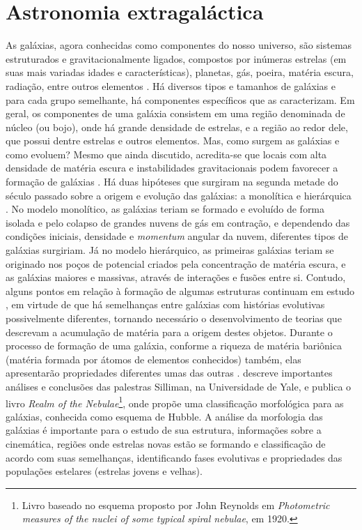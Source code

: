\section{Astronomia extragaláctica}

As galáxias, agora conhecidas como componentes do nosso universo, são sistemas estruturados e gravitacionalmente ligados, compostos por inúmeras estrelas (em suas mais variadas idades e características), planetas, gás, poeira, matéria escura, radiação, entre outros elementos \cite{2018inpe}. Há diversos tipos e tamanhos de galáxias e para cada grupo semelhante, há componentes específicos que as caracterizam. Em geral, os componentes de uma galáxia consistem em uma região denominada de núcleo (ou bojo), onde há grande densidade de estrelas, e a região ao redor dele, que possui dentre estrelas e outros elementos. Mas, como surgem as galáxias e como evoluem? Mesmo que ainda discutido, acredita-se que locais com alta densidade de matéria escura e instabilidades gravitacionais podem favorecer a formação de galáxias \cite{2018sm}. Há duas hipóteses que surgiram na segunda metade do século passado sobre a origem e evolução das galáxias: a monolítica e hierárquica \cite{2022gastao}. No modelo monolítico, as galáxias teriam se formado e evoluído de forma isolada e pelo colapso de grandes nuvens de gás em contração, e dependendo das condições iniciais, densidade e \emph{momentum} angular da nuvem, diferentes tipos de galáxias surgiriam. Já no modelo hierárquico, as primeiras galáxias teriam se originado nos poços de potencial criados pela concentração de matéria escura, e as galáxias maiores e massivas, através de interações e fusões entre si. Contudo, alguns pontos em relação à formação de algumas estruturas continuam em estudo \cite{2018sm}, em virtude de que há semelhanças entre galáxias com histórias evolutivas possivelmente diferentes, tornando necessário o desenvolvimento de teorias que descrevam a acumulação de matéria para a origem destes objetos. Durante o processo de formação de uma galáxia, conforme a riqueza de matéria bariônica (matéria formada por átomos de elementos conhecidos) também, elas apresentarão propriedades diferentes umas das outras \cite{2018cdf}.  descreve importantes análises e conclusões das palestras Silliman, na Universidade de Yale, e publica o livro \emph{Realm of the Nebulae}\footnote{Livro baseado no esquema proposto por John Reynolds em \emph{Photometric measures of the nuclei of some typical spiral nebulae}, em 1920.}, onde propõe uma classificação morfológica para as galáxias, conhecida como esquema de Hubble. A análise da morfologia das galáxias é importante para o estudo de sua estrutura, informações sobre a cinemática, regiões onde estrelas novas estão se formando e classificação de acordo com suas semelhanças, identificando fases evolutivas e propriedades das populações estelares (estrelas jovens e velhas).


